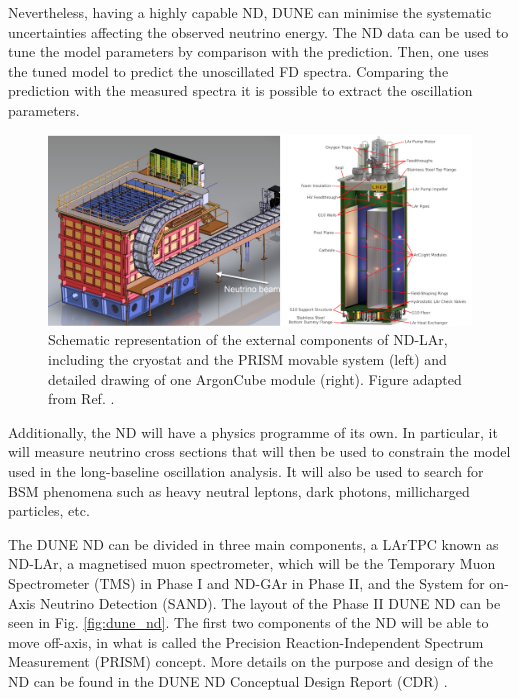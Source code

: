 Nevertheless, having a highly capable ND, DUNE can minimise the systematic uncertainties affecting the observed neutrino energy. The ND data can be used to tune the model parameters by comparison with the prediction. Then, one uses the tuned model to predict the unoscillated FD spectra. Comparing the prediction with the measured spectra it is possible to extract the oscillation parameters.

\begin{figure}[t]
	\centering
	\includegraphics[width=0.99\linewidth]{Images/DUNE/ND/nd_lar_mod}
	\caption[Schematic representation of the external components of ND-LAr, including the cryostat and the PRISM movable system.]{Schematic representation of the external components of ND-LAr, including the cryostat and the PRISM movable system (left) and detailed drawing of one ArgonCube module (right). Figure adapted from Ref. \cite{DUNE2020TDR1}.}
	\label{fig:dune_nd_lar}
\end{figure}

Additionally, the ND will have a physics programme of its own. In particular, it will measure neutrino cross sections that will then be used to constrain the model used in the long-baseline oscillation analysis. It will also be used to search for BSM phenomena such as heavy neutral leptons, dark photons, millicharged particles, etc.

The DUNE ND can be divided in three main components, a LArTPC known as ND-LAr, a magnetised muon spectrometer, which will be the Temporary Muon Spectrometer (TMS) in Phase I and ND-GAr in Phase II, and the System for on-Axis Neutrino Detection (SAND). The layout of the Phase II DUNE ND can be seen in Fig. \ref{fig:dune_nd}. The first two components of the ND will be able to move off-axis, in what is called the Precision Reaction-Independent Spectrum Measurement (PRISM) concept. More details on the purpose and design of the ND can be found in the DUNE ND Conceptual Design Report (CDR) \cite{DUNE2021NDCDR}.

